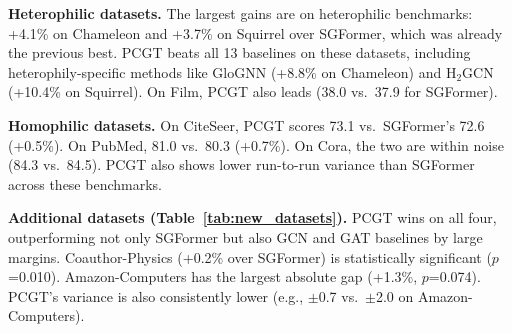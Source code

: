 \begin{table}[t]
\centering
\small
\setlength{\tabcolsep}{3pt}
%
\caption{Accuracy (\%) on four additional datasets. Mean $\pm$ std over 10 runs. GCN and GAT baselines from our own runs on H100.  and  per column.}
\label{tab:new_datasets}
\end{table}

\textbf{Heterophilic datasets.} The largest gains are on heterophilic benchmarks: +4.1\% on Chameleon and +3.7\% on Squirrel over SGFormer, which was already the previous best. PCGT beats all 13 baselines on these datasets, including heterophily-specific methods like GloGNN (+8.8\% on Chameleon) and H$_2$GCN (+10.4\% on Squirrel). On Film, PCGT also leads (38.0 vs.\ 37.9 for SGFormer).

\textbf{Homophilic datasets.} On CiteSeer, PCGT scores 73.1 vs.\ SGFormer's 72.6 (+0.5\%). On PubMed, 81.0 vs.\ 80.3 (+0.7\%). On Cora, the two are within noise (84.3 vs.\ 84.5). PCGT also shows lower run-to-run variance than SGFormer across these benchmarks.

\textbf{Additional datasets (Table~\ref{tab:new_datasets}).} PCGT wins on all four, outperforming not only SGFormer but also GCN and GAT baselines by large margins. Coauthor-Physics (+0.2\% over SGFormer) is statistically significant ($p$=0.010). Amazon-Computers has the largest absolute gap (+1.3\%, $p$=0.074). PCGT's variance is also consistently lower (e.g., $\pm$0.7 vs.\ $\pm$2.0 on Amazon-Computers).

